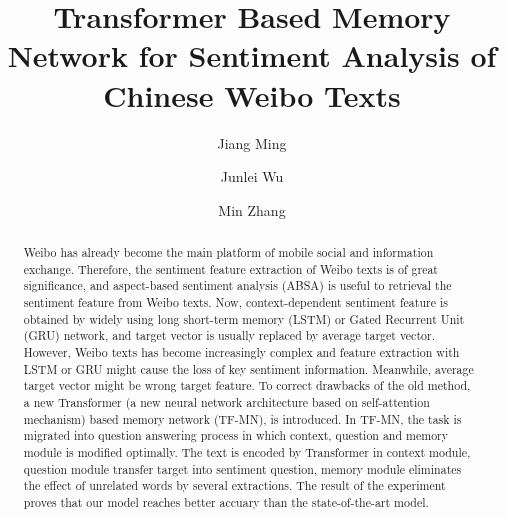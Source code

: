 \documentclass[runningheads, twocolumn]{llncs}
\begin{document}
%
\title{Transformer Based Memory Network for Sentiment Analysis of Chinese Weibo Texts}
%
%
\author{Jiang Ming\and
Junlei Wu\and
Min Zhang}
%
%
%
\maketitle              %
%
\begin{abstract}
Weibo has already become the main platform of mobile social and information exchange. Therefore, the sentiment feature extraction of Weibo texts is of great significance, and aspect-based sentiment analysis (ABSA) is useful to retrieval the sentiment feature from Weibo texts. Now, context-dependent sentiment feature is obtained by widely using long short-term memory (LSTM) or Gated Recurrent Unit (GRU) network, and target vector is usually replaced by average target vector. However, Weibo texts has become increasingly complex and feature extraction with LSTM or GRU might cause the loss of key sentiment information. Meanwhile, average target vector might be wrong target feature. To correct drawbacks of the old method, a new Transformer (a new neural network architecture based on self-attention mechanism) based memory network (TF-MN), is introduced. In TF-MN, the task is migrated into question answering process in which context, question and memory module is modified optimally. The text is encoded by Transformer in context module, question module transfer target into sentiment question, memory module eliminates the effect of unrelated words by several extractions. The result of the experiment proves that our model reaches better accuary than the state-of-the-art model.

\end{abstract}
%
%
%
\end{document}
